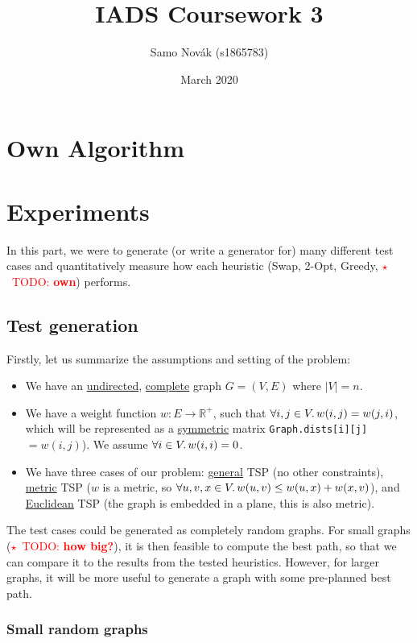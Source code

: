 \documentclass{article}
\title{IADS Coursework 3}
\author{Samo Nov\'ak (s1865783)}
\date{March 2020}
\newcommand{\todo}[1]{\textcolor{red}{$\star$~TODO: \textbf{#1}}}
\newcommand{\R}{\mathbb{R}}
\newcommand{\uu}[1]{\underline{#1}}
\newcommand{\py}[1]{\lstinline[language=Python]{#1}}
\begin{document}
\maketitle

\section{Own Algorithm}

\section{Experiments}

In this part, we were to generate (or write a generator for) many different
test cases and quantitatively measure how each heuristic (Swap, 2-Opt,
Greedy, \todo{own}) performs.

\subsection{Test generation}

Firstly, let us summarize the assumptions and setting of the problem:
\begin{itemize}
\item We have an \uu{undirected}, \uu{complete} graph $G=(V,E)$ where $|V|=n$.
\item We have a weight function $w:E\to\R^{+}$, such that
  $\forall i,j\in V \ldotp w(i,j) = w(j,i)$, which will be represented as
  a \uu{symmetric} matrix \py{Graph.dists[i][j]}\,$= w(i,j)$).
  We assume $\forall i\in V\ldotp w(i,i)=0$.
\item We have three cases of our problem: \uu{general} TSP
  (no other constraints), \uu{metric} TSP ($w$ is a metric, so
  $\forall u,v,x\in V\ldotp w(u,v)\le w(u,x) + w(x,v)$), and
  \uu{Euclidean} TSP (the graph is embedded in a plane, this is also metric).
\end{itemize}

The test cases could be generated as completely random graphs. For small graphs
(\todo{how big?}), it is then feasible to compute the best path, so that we can
compare it to the results from the tested heuristics. However, for larger graphs,
it will be more useful to generate a graph with some pre-planned best path.

\subsubsection{Small random graphs}
\end{document}
